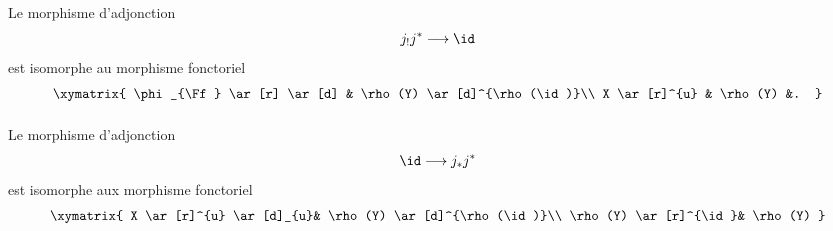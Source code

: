 \documentclass[10pt]{../fichiers-configuration-latex/smfart}
\begin{document}
\paragraph{}
Le morphisme d'adjonction
$$
j_{!}j^{\ast}\longrightarrow \id
$$
est isomorphe au morphisme fonctoriel
\[
\xymatrix{
\phi_{\Ff} \ar[r] \ar[d] & \rho(Y) \ar[d]^{\rho(\id)}\\
X \ar[r]^{u}                 & \rho(Y)     &. }
\]

\paragraph{}
Le morphisme d'adjonction
$$
\id\longrightarrow j_\ast j^{\ast}
$$
est isomorphe aux morphisme fonctoriel
\[
\xymatrix{
X  \ar[r]^{u} \ar[d]_{u}& \rho(Y) \ar[d]^{\rho(\id)}\\
\rho(Y) \ar[r]^{\id}& \rho(Y) }
\]
\end{document}
